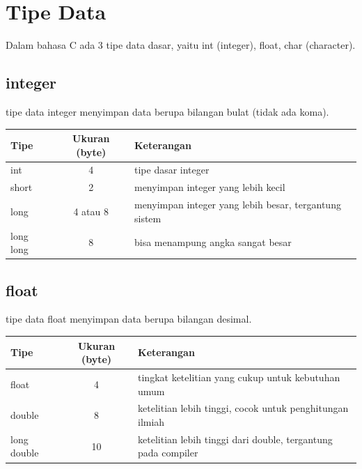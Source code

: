 \section{Tipe Data}

Dalam bahasa C ada 3 tipe data dasar, yaitu int (integer), float, char (character).

\subsection{integer}

tipe data integer menyimpan data berupa bilangan bulat (tidak ada koma).\\
\begin{center}
	\begin{tabular}{|l|c|l|}
		\hline
		\textbf{Tipe} & \textbf{Ukuran (byte)} & \textbf{Keterangan} \\
		\hline
		int 		& 4 		& tipe dasar integer \\
		short 		& 2 		& menyimpan integer yang lebih kecil \\
		long 		& 4 atau 8 	& menyimpan integer yang lebih besar, tergantung sistem \\
		long long 	& 8 		& bisa menampung angka sangat besar \\
		\hline
	\end{tabular}
\end{center}

\subsection{float}

tipe data float menyimpan data berupa bilangan desimal.
\begin{center}
	\begin{tabular}{|l|c|l|}
		\hline
		\textbf{Tipe} & \textbf{Ukuran (byte)} & \textbf{Keterangan} \\
		\hline
		float 		& 4 	& tingkat ketelitian yang cukup untuk kebutuhan umum \\
		double 		& 8 	& ketelitian lebih tinggi, cocok untuk penghitungan ilmiah \\
		long double	& 10 	& ketelitian lebih tinggi dari double, tergantung pada compiler \\
		\hline
	\end{tabular}
\end{center}

